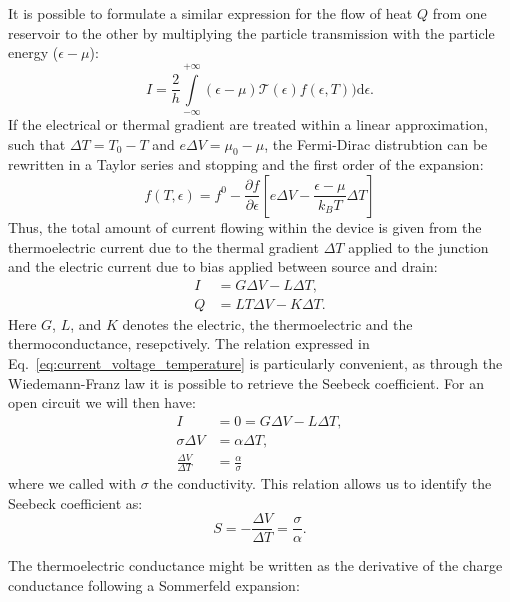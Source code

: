 It is possible to formulate a similar expression for the flow of heat $Q$ from one reservoir to the other by multiplying the particle transmission with the particle
energy ($\epsilon - \mu$):
\begin{equation}
    I = \frac{2}{h} \int\limits_{-\infty}^{+\infty}(\epsilon - \mu)\mathcal{T}(\epsilon)f(\epsilon, T))\text{d}\epsilon.
\end{equation}
If the electrical or thermal gradient are treated within a linear approximation, such that $\Delta T = T_0 - T$ and $e\Delta V = \mu_0 - \mu$, the Fermi-Dirac distrubtion can be rewritten in a Taylor series and stopping and the first order of the expansion:
\begin{equation}
    f(T, \epsilon)=f^{0}-\frac{\partial f}{\partial \epsilon}\left[e \Delta V-\frac{\epsilon-\mu}{k_{B} T} \Delta T\right]
\end{equation}
Thus, the total amount of current flowing within the device is given from the thermoelectric current due to the thermal gradient $\Delta T$ applied to the junction and the electric current due to bias applied between source and drain:
\begin{align}
    I & = G\Delta V - L\Delta T,\label{eq:current_voltage_temperature} \\
    Q & = LT\Delta V - K\Delta T.
\end{align}
Here $G$, $L$, and $K$ denotes the electric, the thermoelectric and the thermoconductance, resepctively. The relation expressed in Eq.~\ref{eq:current_voltage_temperature} is particularly convenient, as through the Wiedemann-Franz law it is possible to retrieve the Seebeck coefficient. For an open circuit we will then have:
\begin{align}
    I                         & = 0 = G\Delta V - L\Delta T,\nonumber \\
    \sigma\Delta V            & = \alpha\Delta T,\nonumber            \\
    \frac{\Delta V}{\Delta T} & = \frac{\alpha}{\sigma}
\end{align}
where we called with $\sigma$ the conductivity. This relation allows us to identify the Seebeck coefficient as:
\begin{equation}
    S = - \frac{\Delta V}{\Delta T} = \frac{\sigma}{\alpha}.
\end{equation}

The thermoelectric conductance might be written as the derivative of the charge conductance following a Sommerfeld expansion:

